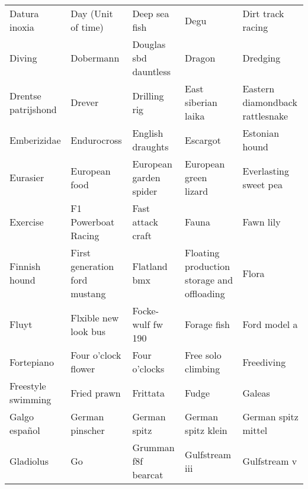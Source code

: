 \documentclass[10pt,journal,compsoc]{IEEEtran}
\begin{document}
\begin{table*}[!h]
\begin{tabular}{lllll}
Datura inoxia             & Day (Unit of time)              & Deep sea fish                     & Degu                                       & Dirt track racing                  \\
Diving                    & Dobermann                       & Douglas sbd dauntless             & Dragon                                     & Dredging                           \\
Drentse patrijshond       & Drever                          & Drilling rig                      & East siberian laika                        & Eastern diamondback rattlesnake    \\
Emberizidae               & Endurocross                     & English draughts                  & Escargot                                   & Estonian hound                     \\
Eurasier                  & European food                   & European garden spider            & European green lizard                      & Everlasting sweet pea              \\
Exercise                  & F1 Powerboat Racing             & Fast attack craft                 & Fauna                                      & Fawn lily                          \\
Finnish hound             & First generation ford mustang   & Flatland bmx                      & Floating production storage and offloading & Flora                              \\
Fluyt                     & Flxible new look bus            & Focke-wulf fw 190                 & Forage fish                                & Ford model a                       \\
Fortepiano                & Four o'clock flower             & Four o'clocks                     & Free solo climbing                         & Freediving                         \\
Freestyle swimming        & Fried prawn                     & Frittata                          & Fudge                                      & Galeas                             \\
Galgo español             & German pinscher                 & German spitz                      & German spitz klein                         & German spitz mittel                \\
Gladiolus                 & Go                              & Grumman f8f bearcat               & Gulfstream iii                             & Gulfstream v                       \\

\end{tabular}
\end{table*}
\end{document}
